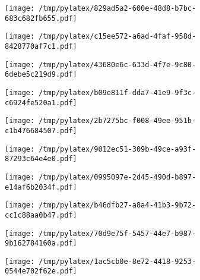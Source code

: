 \documentclass{article}
\begin{document}
\begin{figure}[htbp]
\begin{subfigure}[b]{.3\linewidth}
\texttt{[image: /tmp/pylatex/829ad5a2-600e-48d8-b7bc-683c682fb655.pdf]}
\end{subfigure}
\begin{subfigure}[b]{.3\linewidth}
\texttt{[image: /tmp/pylatex/c15ee572-a6ad-4faf-958d-8428770af7c1.pdf]}
\end{subfigure}
\begin{subfigure}[b]{.3\linewidth}
\texttt{[image: /tmp/pylatex/43680e6c-633d-4f7e-9c80-6debe5c219d9.pdf]}
\end{subfigure}
\begin{subfigure}[b]{.3\linewidth}
\texttt{[image: /tmp/pylatex/b09e811f-dda7-41e9-9f3c-c6924fe520a1.pdf]}
\end{subfigure}
\begin{subfigure}[b]{.3\linewidth}
\texttt{[image: /tmp/pylatex/2b7275bc-f008-49ee-951b-c1b476684507.pdf]}
\end{subfigure}
\begin{subfigure}[b]{.3\linewidth}
\texttt{[image: /tmp/pylatex/9012ec51-309b-49ce-a93f-87293c64e4e0.pdf]}
\end{subfigure}
\begin{subfigure}[b]{.3\linewidth}
\texttt{[image: /tmp/pylatex/0995097e-2d45-490d-b897-e14af6b2034f.pdf]}
\end{subfigure}
\begin{subfigure}[b]{.3\linewidth}
\texttt{[image: /tmp/pylatex/b46dfb27-a8a4-41b3-9b72-cc1c88aa0b47.pdf]}
\end{subfigure}
\begin{subfigure}[b]{.3\linewidth}
\texttt{[image: /tmp/pylatex/70d9e75f-5457-44e7-b987-9b162784160a.pdf]}
\end{subfigure}
\begin{subfigure}[b]{.3\linewidth}
\texttt{[image: /tmp/pylatex/1ac5cb0e-8e72-4418-9253-0544e702f62e.pdf]}
\end{subfigure}
\end{figure}
\end{document}
